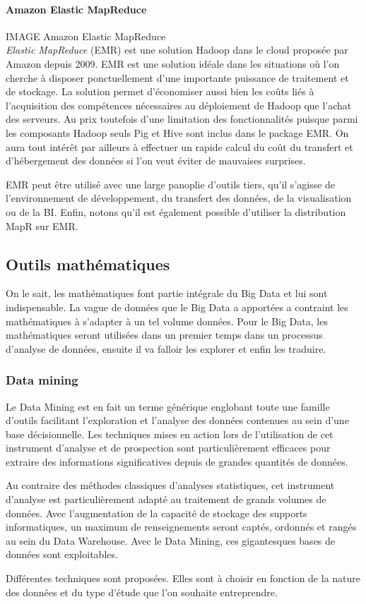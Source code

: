\documentclass[12pt]{article}
\begin{document}
\paragraph{Amazon Elastic MapReduce}
IMAGE Amazon Elastic MapReduce \\
\textit{Elastic MapReduce} (EMR) est une solution Hadoop dans le cloud proposée par Amazon depuis 2009. EMR est une solution idéale dans les situations où l'on cherche à disposer ponctuellement d'une importante puissance de traitement et de stockage. La solution permet d'économiser aussi bien les coûts liés à l'acquisition des compétences nécessaires au déploiement de Hadoop que l'achat des serveurs. Au prix toutefois d'une limitation des fonctionnalités puisque parmi les composants Hadoop seuls Pig et Hive sont inclus dans le package EMR. On aura tout intérêt par ailleurs à effectuer un rapide calcul du coût du transfert et d'hébergement des données si l'on veut éviter de mauvaises surprises.
 
EMR peut être utilisé avec une large panoplie d'outils tiers, qu'il s'agisse de l'environnement de développement, du transfert des données, de la visualisation ou de la BI. Enfin, notons qu'il est également possible d'utiliser la distribution MapR sur EMR.
\subsection{Outils mathématiques}
On le sait, les mathématiques font partie intégrale du Big Data et lui sont indispensable. La vague de données que le Big Data a apportées a contraint les mathématiques à s'adapter à un tel volume données. Pour le Big Data, les mathématiques seront utilisées dans un premier temps dans un processus d'analyse de données, ensuite il va falloir les explorer et enfin les traduire.
\subsubsection{Data mining}
Le Data Mining est en fait un terme générique englobant toute une famille d'outils facilitant l'exploration et l'analyse des données contenues au sein d'une base décisionnelle. Les techniques mises en action lors de l'utilisation de cet instrument d'analyse et de prospection sont particulièrement efficaces pour extraire des informations significatives depuis de grandes quantités de données.\par
Au contraire des méthodes classiques d'analyses statistiques, cet instrument d'analyse est particulièrement adapté au traitement de grands volumes de données. Avec l'augmentation de la capacité de stockage des supports informatiques, un maximum de renseignements seront captés, ordonnés et rangés au sein du Data Warehouse. Avec le Data Mining, ces gigantesques bases de données sont exploitables.
\par
Différentes techniques sont proposées. Elles sont à choisir en fonction de la nature des données et du type d'étude que l'on souhaite entreprendre.\par
\end{document}
